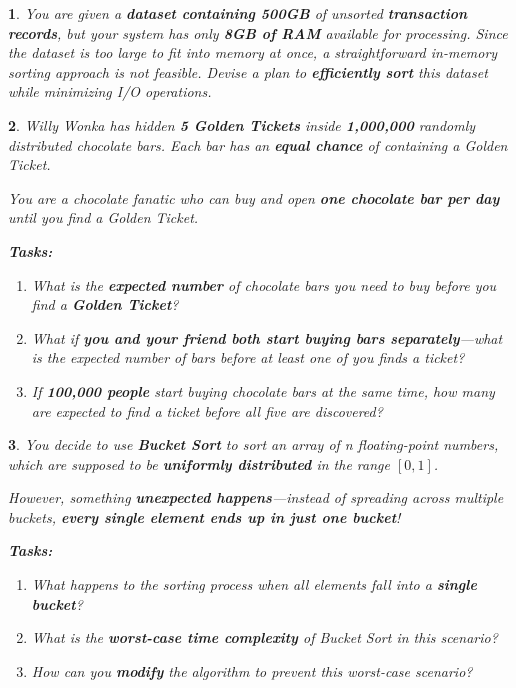 \documentclass[%
addpoints]{exam}
\theoremstyle{problem}
\newtheorem{p}{}
\begin{document}
\begin{p}
You are given a \textbf{dataset containing 500GB} of unsorted \textbf{transaction records}, but your system has only \textbf{8GB of RAM} available for processing. Since the dataset is too large to fit into memory at once, a straightforward in-memory sorting approach is not feasible. Devise a plan to \textbf{efficiently sort} this dataset while minimizing I/O operations.
\hfill\end{p}

\begin{p}
Willy Wonka has hidden \textbf{5 Golden Tickets} inside \textbf{1,000,000} randomly distributed chocolate bars. Each bar has an \textbf{equal chance} of containing a Golden Ticket.

You are a chocolate fanatic who can buy and open \textbf{one chocolate bar per day} until you find a Golden Ticket.

\textbf{Tasks:}
\begin{enumerate}
    \item What is the \textbf{expected number} of chocolate bars you need to buy before you find a \textbf{Golden Ticket}?
    \item What if \textbf{you and your friend both start buying bars separately}—what is the expected number of bars before at least one of you finds a ticket?
    \item If \textbf{100,000 people} start buying chocolate bars at the same time, how many are expected to find a ticket before all five are discovered?
\end{enumerate}
\hfill\end{p}

\begin{p}
You decide to use \textbf{Bucket Sort} to sort an array of \textit{n} floating-point numbers, which are supposed to be \textbf{uniformly distributed} in the range \([0, 1]\).

However, something \textbf{unexpected happens}—instead of spreading across multiple buckets, \textbf{every single element ends up in just one bucket}!

\textbf{Tasks:}
\begin{enumerate}
    \item What happens to the sorting process when all elements fall into a \textbf{single bucket}?
    \item What is the \textbf{worst-case time complexity} of Bucket Sort in this scenario?
    \item How can you \textbf{modify} the algorithm to prevent this worst-case scenario?
\end{enumerate}
\hfill\end{p}
\end{document}
